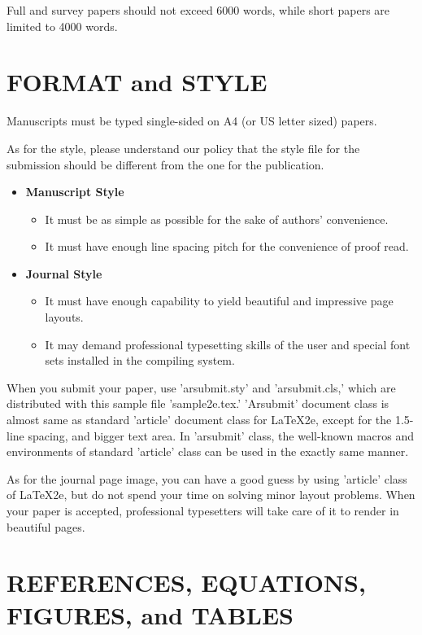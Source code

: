 \documentclass{arsubmit}
\begin{document}
Full and survey papers should not exceed 6000 words, while short papers
are limited to 4000 words.
\section{FORMAT and STYLE}
\label{sec:Format and Style}

Manuscripts must be typed single-sided on A4 (or US letter sized) papers.

As for the style, please understand our policy that the style file for
the submission should be different from the one for the 
publication.
\begin{itemize}
\item {\bf Manuscript Style}
  \begin{itemize}
  \item It must be as simple as possible for the sake of authors'
convenience.
  \item It must have enough line spacing pitch for the convenience
  of proof read.
  \end{itemize}
\item {\bf Journal Style}
  \begin{itemize}
  \item It must have enough capability to yield beautiful and 
impressive page layouts.
  \item It may demand professional typesetting skills of the user and
    special font sets installed in the compiling system.
  \end{itemize}
\end{itemize}

When you submit your paper, use 'arsubmit.sty' and 'arsubmit.cls,'
which are distributed with this sample file 'sample2e.tex.'
'Arsubmit' document class is almost same as standard 'article' 
document class for
LaTeX2e, except for the 1.5-line spacing, and bigger text area.
In 'arsubmit' class, the well-known macros and environments of
standard 'article' class can be used in the exactly same manner.

As for the journal page image, you can have a good guess by using
'article' class of LaTeX2e, but do not spend your time on solving
minor layout problems.  When your paper is accepted, professional 
typesetters will take care of it to render in beautiful pages.

\section{REFERENCES, EQUATIONS, FIGURES, and TABLES}
\label{sec:References, Equations, Figures, and Tables}
\end{document}
